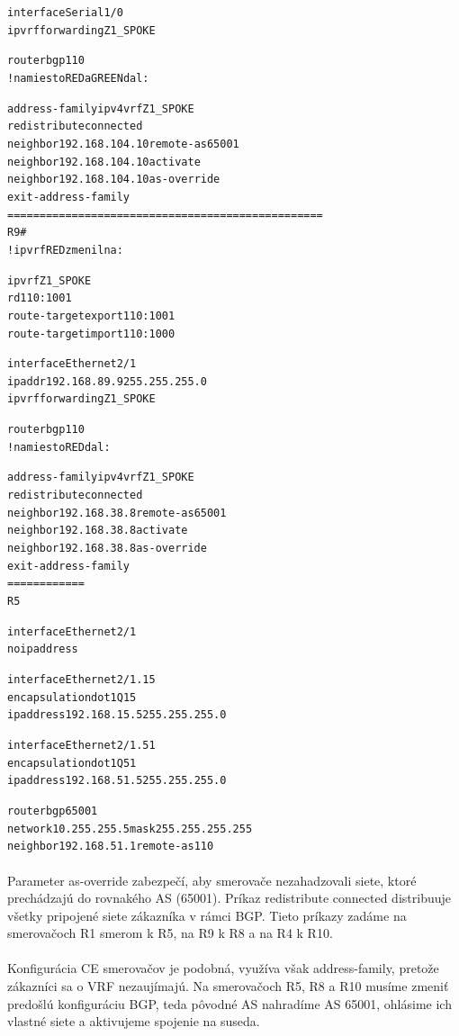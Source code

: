 \documentclass[12pt,twoside,a4paper]{report}
\begin{document}
{\begin{small}
\begin{alltt}
interface Serial1/0
 ip vrf forwarding Z1_SPOKE

router bgp 110
!namiesto RED a GREEN dal:

 address-family ipv4 vrf Z1_SPOKE
  redistribute connected
  neighbor 192.168.104.10 remote-as 65001
  neighbor 192.168.104.10 activate
  neighbor 192.168.104.10 as-override
 exit-address-family
=================================================
R9#
!ip vrf RED zmenil na:

ip vrf Z1_SPOKE
 rd 110:1001
 route-target export 110:1001
 route-target import 110:1000

interface Ethernet2/1
 ip addr 192.168.89.9 255.255.255.0
 ip vrf forwarding Z1_SPOKE

router bgp 110
!namiesto RED dal:

 address-family ipv4 vrf Z1_SPOKE
  redistribute connected
  neighbor 192.168.38.8 remote-as 65001
  neighbor 192.168.38.8 activate
  neighbor 192.168.38.8 as-override
 exit-address-family
============
R5

interface Ethernet2/1
 no ip address

interface Ethernet2/1.15
 encapsulation dot1Q 15
 ip address 192.168.15.5 255.255.255.0

interface Ethernet2/1.51
 encapsulation dot1Q 51
 ip address 192.168.51.5 255.255.255.0

router bgp 65001
 network 10.255.255.5 mask 255.255.255.255
 neighbor 192.168.51.1 remote-as 110
\end{alltt}
\end{small}
}

\paragraph{}
Parameter as-override zabezpečí, aby smerovače nezahadzovali siete, ktoré prechádzajú do rovnakého AS (65001). Príkaz redistribute connected distribuuje všetky pripojené siete zákazníka v rámci BGP. Tieto príkazy zadáme na smerovačoch R1 smerom k R5, na R9 k R8 a na R4 k R10.

\paragraph{}
Konfigurácia CE smerovačov je podobná, využíva však address-family, pretože zákazníci sa o VRF nezaujímajú. Na smerovačoch R5, R8 a R10 musíme zmeniť predošlú konfiguráciu BGP, teda pôvodné AS nahradíme AS 65001, ohlásime ich vlastné siete a aktivujeme spojenie na suseda.
\end{document}
